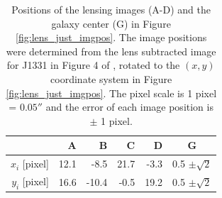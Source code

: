 \documentclass[useAMS,usenatbib]{mnras}
\begin{document}
\begin{table}
\centering
\caption{Positions of the lensing images (A-D) and the galaxy center (G) in Figure \ref{fig:lens_just_imgpos}. The image positions were determined from the lens subtracted image for J1331 in Figure 4 of \citet{SWELLSIII}, rotated to the $(x,y)$ coordinate system in Figure \ref{fig:lens_just_imgpos}. The pixel scale is 1 pixel = $0.05''$ and the error of each image position is $\pm$ 1 pixel.}
\begin{tabular}{r|rrrr|c}
\hline
  & A & B & C & D & G\\\hline
$x_i$ [pixel] & 12.1 & -8.5 & 21.7 & -3.3 & 0.5 $\pm \sqrt{2}$ \\
$y_i$ [pixel] & 16.6 & -10.4 & -0.5 & 19.2 & 0.5 $\pm \sqrt{2}$ \\
\hline
\end{tabular}
\label{tab:lenspos}
\end{table}
\end{document}
